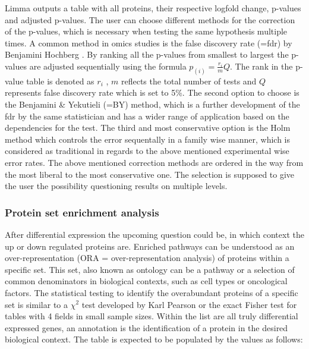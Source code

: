 \documentclass[
  11pt,
]{article}
\begin{document}
Limma outputs a table with all proteins, their respective logfold change, p-values and adjusted p-values. The user can choose different methods for the correction of the p-values, which is necessary when testing the same hypothesis multiple times. A common method in omics studies is the false discovery rate (=fdr) by Benjamini Hochberg \citep{Benjamini1995}. By ranking all the p-values from smallest to largest the p-values are adjusted sequentially using the formula \(p_(i) = \frac{r_i}{m} Q\). The rank in the p-value table is denoted as \(r_i\) , \(m\) reflects the total number of tests and \(Q\) represents false discovery rate which is set to 5\%. The second option to choose is the Benjamini \& Yekutieli (=BY) \citep{Benjamini2001}method, which is a further development of the fdr by the same statistician and has a wider range of application based on the dependencies for the test.
The third and most conservative option is the Holm method \citep{Holm1979} which controls the error sequentally in a family wise manner, which is considered as traditional in regards to the above mentioned experimental wise error rates. The above mentioned correction methods are ordered in the way from the most liberal to the most conservative one. The selection is supposed to give the user the possibility questioning results on multiple levels.

\hypertarget{protein-set-enrichment-analysis}{%
\subsubsection{Protein set enrichment analysis}\label{protein-set-enrichment-analysis}}

After differential expression the upcoming question could be, in which context the up or down regulated proteins are. Enriched pathways can be understood as an over-representation (ORA = over-representation analysis) of proteins within a specific set. This set, also known as ontology can be a pathway or a selection of common denominators in biological contexts, such as cell types or oncological factors. The statistical testing to identify the overabundant proteins of a specific set is similar to a \(\chi^2\) test developed by Karl Pearson \citep{Pearson1900} or the exact Fisher test \citep{Sprent2011} for tables with 4 fields in small sample sizes. Within the list are all truly differential expressed genes, an annotation is the identification of a protein in the desired biological context.
The table is expected to be populated by the values as follows:
\end{document}
